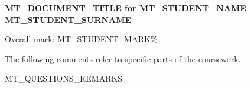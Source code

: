 \documentclass[fleqn,12pt]{article}
\begin{document}
\begin{center}
\Large{\textbf{MT_DOCUMENT_TITLE for MT_STUDENT_NAME MT_STUDENT_SURNAME}}
\end{center}

{\noindent}Overall mark: MT_STUDENT_MARK\%

\vspace*{10pt}
{\noindent}The following comments refer to specific parts of the coursework.

MT_QUESTIONS_REMARKS
\end{document}

